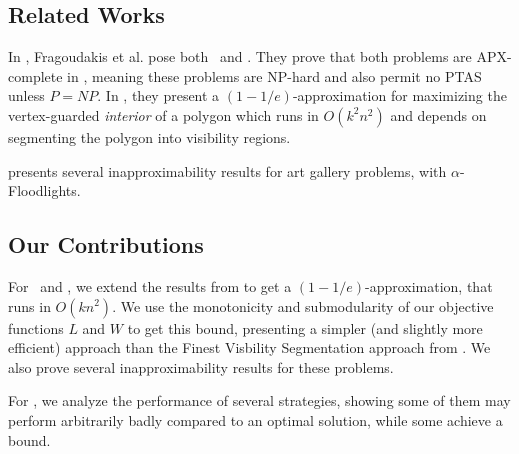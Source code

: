 \subsection{Related Works}
In \cite{fragoudakis-interior,fragoudakis-boundary,fragoudakis-paintings}, Fragoudakis et al. pose both \MLVG\ and \MVVG. They prove that both problems are APX-complete in \cite{fragoudakis-boundary}, meaning these problems are NP-hard and also permit no PTAS unless $P=NP$. In \cite{fragoudakis-interior}, they present a $(1-1/e)$-approximation for maximizing the vertex-guarded \emph{interior} of a polygon which runs in $O(k^2n^2)$ and depends on segmenting the polygon into visibility regions.

\cite{abdelkader} presents several inapproximability results for art gallery problems, with $\alpha$-Floodlights.


\cite{bukov}

\subsection{Our Contributions}
For \MLVG\ and \MVVG, we extend the results from \cite{fragoudakis-interior} to get a $(1-1/e)$-approximation, that runs in $O(kn^2)$. We use the monotonicity and submodularity of our objective functions $L$ and $W$ to get this bound, presenting a simpler (and slightly more efficient) approach than the Finest Visbility Segmentation approach from \cite{fragoudakis-interior,fragoudakis-paintings}. We also prove several inapproximability results for these problems.

For \DMVVG, we analyze the performance of several strategies, showing some of them may perform arbitrarily badly compared to an optimal solution, while some achieve a bound. 








